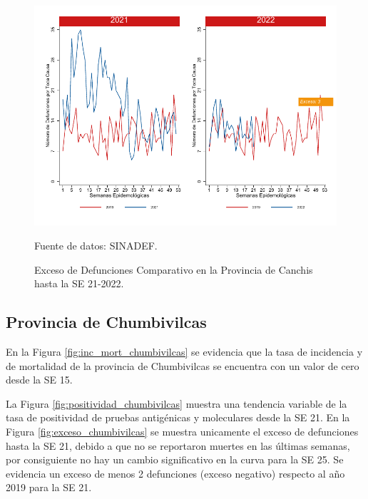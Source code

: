 \documentclass[12pt,a4paper,openany]{book}
\begin{document}
	\begin{figure}[h]
		\caption{Exceso de Defunciones Comparativo en la Provincia de Canchis hasta la SE 21-2022.}\label{fig:exceso_canchis}
		\begin{center}
			\includegraphics[width=0.7\linewidth]{../figuras/exceso_5.pdf}
		\end{center}
		{\footnotesize {Fuente de datos: SINADEF.}}
	\end{figure}
	
	\clearpage
	
	\subsection*{Provincia de Chumbivilcas}
	\noindent En la Figura \ref{fig:inc_mort_chumbivilcas} se evidencia que la tasa de incidencia y de mortalidad de la provincia de Chumbivilcas se encuentra con un valor de cero desde la SE 15. 
	
	\noindent La Figura \ref{fig:positividad_chumbivilcas} muestra una tendencia variable de la tasa de positividad de pruebas antigénicas y moleculares desde la SE 21. En la Figura \ref{fig:exceso_chumbivilcas} se muestra unicamente el exceso de defunciones hasta la SE 21, debido a que no se reportaron muertes en las últimas semanas, por consiguiente no hay un cambio significativo en la curva para la SE 25. Se evidencia un exceso de menos 2 defunciones (exceso negativo) respecto al año 2019 para la SE 21.
	
\end{document}
